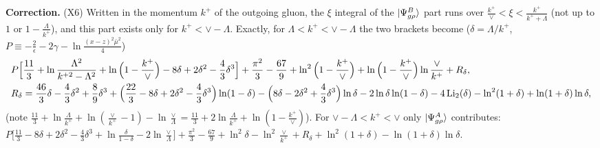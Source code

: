 \documentclass[10pt]{article}
\numberwithin{equation}{section}
\begin{document}
{\color{blue}\noindent\textbf{Correction.} (X6) Written in the momentum $k^+$ of the outgoing gluon, the $\xi$ integral of the $\ket{\Psi^B_{g\rho}}$ part runs over $\frac{k^+}{\vee}<\xi<\frac{k^+}{k^++\Lambda}$ (not up to $1$ or $1-\frac{\Lambda}{k^+}$), and this part exists only for $k^+<\vee-\Lambda$. Exactly, for $\Lambda<k^+<\vee-\Lambda$ the two brackets become ($\delta=\Lambda/k^+$, $P\equiv-\frac2\epsilon-2\gamma-\ln\frac{(x-z)^2\bar\mu^2}{4}$)
\begin{align*}
&P\Big[\frac{11}{3}+\ln\frac{\Lambda^2}{k^{+2}-\Lambda^2}+\ln\Big(1-\frac{k^+}{\vee}\Big)-8\delta+2\delta^2-\frac43\delta^3\Big]+\frac{\pi^2}{3}-\frac{67}{9}+\ln^2\Big(1-\frac{k^+}{\vee}\Big)+\ln\Big(1-\frac{k^+}{\vee}\Big)\ln\frac{\vee}{k^+}+R_\delta,\\
&R_\delta=\frac{46}{3}\delta-\frac43\delta^2+\frac89\delta^3+\Big(\frac{22}{3}-8\delta+2\delta^2-\frac43\delta^3\Big)\ln(1-\delta)-\Big(8\delta-2\delta^2+\frac43\delta^3\Big)\ln\delta-2\ln\delta\ln(1-\delta)-4\,{\rm Li}_2(\delta)-\ln^2(1+\delta)+\ln(1+\delta)\ln\delta,
\end{align*}
(note $\frac{11}{3}+\ln\frac{\Lambda}{k^+}+\ln(\frac{\vee}{k^+}-1)-\ln\frac{\vee}{\Lambda}=\frac{11}{3}+2\ln\frac{\Lambda}{k^+}+\ln(1-\frac{k^+}{\vee})$). For $\vee-\Lambda<k^+<\vee$ only $\ket{\Psi^A_{g\rho}}$ contributes:
$P\big[\frac{11}{3}-8\delta+2\delta^2-\frac43\delta^3+\ln\frac{\delta}{1-\delta}-2\ln\frac{\vee}{\Lambda}\big]+\frac{\pi^2}{3}-\frac{67}{9}+\ln^2\delta-\ln^2\frac{\vee}{k^+}+R_\delta+\ln^2(1+\delta)-\ln(1+\delta)\ln\delta$.}
\end{document}
